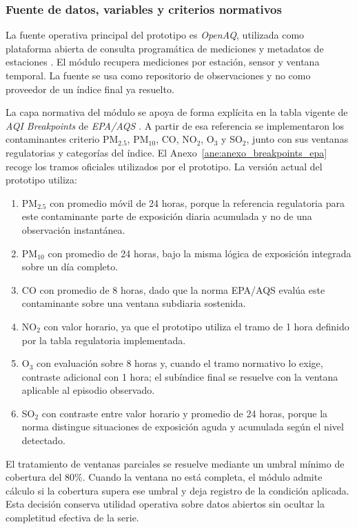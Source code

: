 \subsubsection{Fuente de datos, variables y criterios normativos}
La fuente operativa principal del prototipo es \textit{OpenAQ}, utilizada como plataforma abierta de consulta programática de mediciones y metadatos de estaciones \cite{DATA_OPENAQ}. El módulo recupera mediciones por estación, sensor y ventana temporal. La fuente se usa como repositorio de observaciones y no como proveedor de un índice final ya resuelto.

La capa normativa del módulo se apoya de forma explícita en la tabla vigente de \textit{AQI Breakpoints} de \textit{EPA/AQS} \cite{DATA_EPA_AQS_BREAKPOINTS}. A partir de esa referencia se implementaron los contaminantes criterio PM$_{2.5}$, PM$_{10}$, CO, NO$_2$, O$_3$ y SO$_2$, junto con sus ventanas regulatorias y categorías del índice. El Anexo~\ref{ane:anexo_breakpoints_epa} recoge los tramos oficiales utilizados por el prototipo. La versión actual del prototipo utiliza:
\begin{enumerate}
\item PM$_{2.5}$ con promedio móvil de 24 horas, porque la referencia regulatoria para este contaminante parte de exposición diaria acumulada y no de una observación instantánea.
\item PM$_{10}$ con promedio de 24 horas, bajo la misma lógica de exposición integrada sobre un día completo.
\item CO con promedio de 8 horas, dado que la norma EPA/AQS evalúa este contaminante sobre una ventana subdiaria sostenida.
\item NO$_2$ con valor horario, ya que el prototipo utiliza el tramo de 1 hora definido por la tabla regulatoria implementada.
\item O$_3$ con evaluación sobre 8 horas y, cuando el tramo normativo lo exige, contraste adicional con 1 hora; el subíndice final se resuelve con la ventana aplicable al episodio observado.
\item SO$_2$ con contraste entre valor horario y promedio de 24 horas, porque la norma distingue situaciones de exposición aguda y acumulada según el nivel detectado.
\end{enumerate}

El tratamiento de ventanas parciales se resuelve mediante un umbral mínimo de cobertura del 80\%. Cuando la ventana no está completa, el módulo admite cálculo si la cobertura supera ese umbral y deja registro de la condición aplicada. Esta decisión conserva utilidad operativa sobre datos abiertos sin ocultar la completitud efectiva de la serie.

